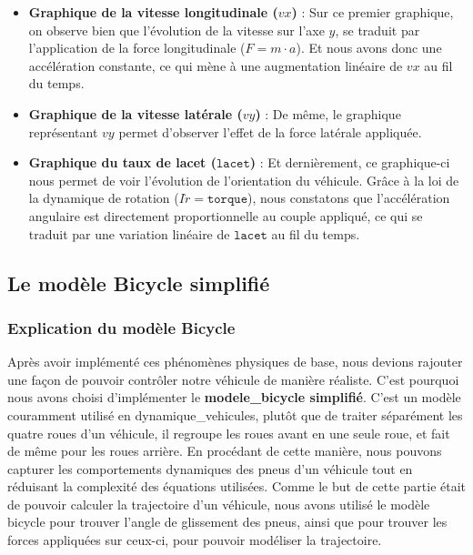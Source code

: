 \begin{itemize}
    \item \textbf{Graphique de la vitesse longitudinale ($vx$)} : Sur ce premier graphique, on observe bien que l'évolution de la vitesse sur l'axe $y$, se traduit par l'application de la force longitudinale ($ F = m \cdot a $).
    Et nous avons donc une accélération constante, ce qui mène à une augmentation linéaire de $vx$ au fil du temps.

    \item \textbf{Graphique de la vitesse latérale ($vy$)} : De même, le graphique représentant $vy$ permet d'observer l'effet de la force latérale appliquée.

    \item \textbf{Graphique du taux de lacet ({$\texttt{lacet}$})} : Et dernièrement, ce graphique-ci nous permet de voir l'évolution de l'orientation du véhicule.
    Grâce à la loi de la dynamique de rotation ($I\dot{r} = \texttt{torque}$), nous constatons que l'accélération angulaire est directement proportionnelle au couple appliqué, ce qui se traduit par une variation linéaire de $\texttt{lacet}$ au fil du temps.
\end{itemize}

\subsection{Le modèle Bicycle simplifié}\label{subsec:le-modele-bicycle-simplifie}

\subsubsection{Explication du modèle Bicycle}
Après avoir implémenté ces phénomènes physiques de base, nous devions rajouter une façon de pouvoir contrôler notre véhicule de manière réaliste.
C'est pourquoi nous avons choisi d'implémenter le \textbf{\gls{modele_bicycle} simplifié}.
C'est un modèle couramment utilisé en \glspl{dynamique_vehicule}, plutôt que de traiter séparément les quatre roues d'un véhicule, il regroupe les roues avant en une seule roue, et fait de même pour les roues arrière.
En procédant de cette manière, nous pouvons capturer les comportements dynamiques des pneus d'un véhicule tout en réduisant la complexité des équations utilisées.
Comme le but de cette partie était de pouvoir calculer la trajectoire d'un véhicule, nous avons utilisé le modèle bicycle pour trouver l'angle de glissement des pneus, ainsi que pour trouver les forces appliquées sur ceux-ci, pour pouvoir modéliser la trajectoire.

